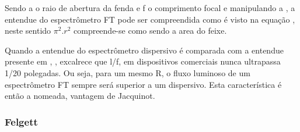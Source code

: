 \documentclass[oneside,openright,12pt]{ufsm_2021} %
\begin{document}
    \par Sendo a o raio de abertura da fenda e f o comprimento focal e manipulando a \cite{Eq1}, a entendue do espectrômetro FT pode ser compreendida como é visto na equação \cite{Eq7}, neste sentido $\pi^2.r^2$ compreende-se como sendo a area do feixe. 

    \par Quando a entendue do espectrômetro dispersivo \cite {eq?} é comparada com a entendue presente em \cite{Eq8}, \cite{LivroFT}, excalrece que l/f, em dispositivos comerciais nunca ultrapassa 1/20 polegadas. Ou seja, para um mesmo R, o fluxo luminoso de um espectrômetro FT sempre será superior a um dispersivo. Esta característica é então a nomeada, vantagem de Jacquinot.

    \subsubsection{Felgett}
\end{document}
